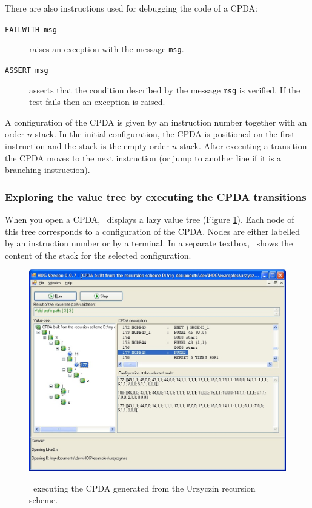 There are also instructions used for debugging the code of a CPDA:
\begin{description}
  \item[{\tt FAILWITH msg}] raises an exception with the message {\tt msg}.
  \item[{\tt ASSERT msg}] asserts that the condition described by the message {\tt msg} is verified. If the test fails then an exception is raised.
\end{description}



A configuration of the CPDA is given by an instruction number together with an order-$n$ stack. In the initial configuration, the CPDA is positioned on the first instruction and the stack is the empty order-$n$ stack. After executing a transition the CPDA moves to the next instruction (or jump to another line if it is a branching instruction).




\subsubsection{Exploring the value tree by executing the CPDA transitions }

When you open a CPDA, \toolname\ displays a lazy value tree (Figure \ref{fig:sshot_cpda}). Each node of this tree corresponds to a configuration of the CPDA. Nodes are either labelled by an instruction number or by a terminal. In a separate textbox, \toolname\ shows the content of the stack for the selected configuration.

\begin{figure}
\begin{bigcenter}
  \includegraphics[width=14cm]{sshot_cpda}\\
\end{bigcenter}
  \caption{\toolname\ executing the CPDA generated from the Urzyczin recursion scheme.}
  \label{fig:sshot_cpda}
\end{figure}

